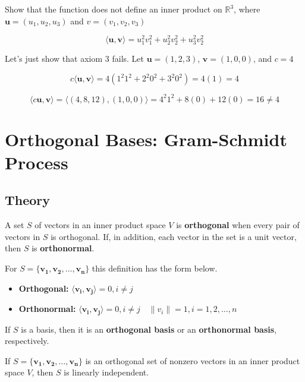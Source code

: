 \documentclass{report}
\begin{document}
\begin{tcolorbox}[colframe = lightred]
	Show that the function does not define an inner product on $\mathbb{R}^3$, where $\bm{u} = (u_1, u_2, u_3)$ and $v=(v_1,v_2,v_3)$
	
	$$
	\langle \bm{u}, \bm{v} \rangle = u_1 ^2 v_1 ^2 + u_2 ^2 v_2 ^2 + u_3 ^2 v_2 ^2
	$$
\end{tcolorbox}

Let's just show that axiom 3 fails. Let $\bm{u} = (1,2,3)$, $\bm{v} = (1,0,0)$, and $c=4$ 

$$
c \langle \bm{u}, \bm{v} \rangle = 	 4 (1^2 1^2 + 2^2 0^2 + 3^2 0^2) = 4(1) = 4
$$

$$
\langle c \bm{u}, \bm{v} \rangle = \langle (4,8,12), (1,0,0) \rangle = 4^2 1^2 + 8(0) + 12(0) = 16 \ne 4
$$

\section{Orthogonal Bases: Gram-Schmidt Process}

\subsection{Theory}

\begin{tcolorbox}[title = Defintions of Orthogonal and Orthogonal Sets]
	A set $S$ of vectors in an inner product space $V$ is \textbf{orthogonal} when every pair of vectors in $S$ is orthogonal. If, in addition, each vector in the set is a unit vector, then $S$ is \textbf{orthonormal}.
	
	For $S = \{ \bm{v_1}, \bm{v_2}, \hdots, \bm{v_n}\}$ this definition has the form below.
	
	\begin{itemize}
		\item \textbf{Orthogonal:} $\langle \bm{v_i}, \bm{v_j} \rangle = 0, i \ne j$
		\item \textbf{Orthonormal:} $\langle \bm{v_i}, \bm{v_j} \rangle = 0, i \ne j \quad \| v_{i} \| = 1, i = 1,2,\hdots,n$
	\end{itemize}
	
	If $S$ is a basis, then it is an \textbf{orthogonal basis} or an \textbf{orthonormal basis}, respectively.
\end{tcolorbox}

\begin{tcolorbox}[title = Orthogonal Sets are Linearly Independet]
	If $S = \{ \bm{v_1}, \bm{v_2}, \hdots, \bm{v_n}\}$ is an orthogonal set of nonzero vectors in an inner product space $V$, then $S$ is linearly independent.
\end{tcolorbox}
\end{document}
